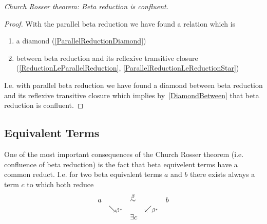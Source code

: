 \begin{theorem}
    \label{ChurchRosser}
    \emph{Church Rosser theorem: Beta reduction is confluent.}

    \begin{proof}
        With the parallel beta reduction we have found a relation which is
        \begin{enumerate}
            \item a diamond (\ref{ParallelReductionDiamond})

            \item between beta reduction and its reflexive transitive closure
                (\ref{ReductionLeParallelReduction},
                \ref{ParallelReductionLeReductionStar})
        \end{enumerate}

        I.e. with parallel beta reduction we have found a diamond between beta
        reduction and its reflexive transitive closure which implies
        by~\ref{DiamondBetween} that beta reduction is confluent.
    \end{proof}
\end{theorem}



\subsection{Equivalent Terms}

One of the most important consequences of the Church Rosser theorem (i.e.
confluence of beta reduction) is the fact that beta equivelent terms have a
common reduct. I.e. for two beta equivalent terms $a$ and $b$ there exists
always a term $c$ to which both reduce
$$
    \begin{array}{lllll}
    a & & \stackrel{\beta}{\sim} & & b
    \\
    &\searrow_{\beta^*}
    &
    &\swarrow_{\beta^*}
    \\
    & & \exists c
    \end{array}
$$

